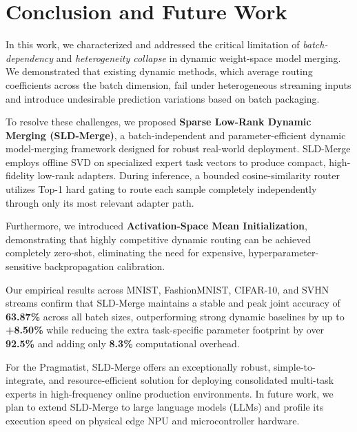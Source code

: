 \section{Conclusion and Future Work}
\label{sec:conclusion}

In this work, we characterized and addressed the critical limitation of \emph{batch-dependency} and \emph{heterogeneity collapse} in dynamic weight-space model merging. We demonstrated that existing dynamic methods, which average routing coefficients across the batch dimension, fail under heterogeneous streaming inputs and introduce undesirable prediction variations based on batch packaging. 

To resolve these challenges, we proposed \textbf{Sparse Low-Rank Dynamic Merging (SLD-Merge)}, a batch-independent and parameter-efficient dynamic model-merging framework designed for robust real-world deployment. SLD-Merge employs offline SVD on specialized expert task vectors to produce compact, high-fidelity low-rank adapters. During inference, a bounded cosine-similarity router utilizes Top-1 hard gating to route each sample completely independently through only its most relevant adapter path. 

Furthermore, we introduced \textbf{Activation-Space Mean Initialization}, demonstrating that highly competitive dynamic routing can be achieved completely zero-shot, eliminating the need for expensive, hyperparameter-sensitive backpropagation calibration. 

Our empirical results across MNIST, FashionMNIST, CIFAR-10, and SVHN streams confirm that SLD-Merge maintains a stable and peak joint accuracy of \textbf{63.87\%} across all batch sizes, outperforming strong dynamic baselines by up to \textbf{+8.50\%} while reducing the extra task-specific parameter footprint by over \textbf{92.5\%} and adding only \textbf{8.3\%} computational overhead. 

For the Pragmatist, SLD-Merge offers an exceptionally robust, simple-to-integrate, and resource-efficient solution for deploying consolidated multi-task experts in high-frequency online production environments. In future work, we plan to extend SLD-Merge to large language models (LLMs) and profile its execution speed on physical edge NPU and microcontroller hardware.
